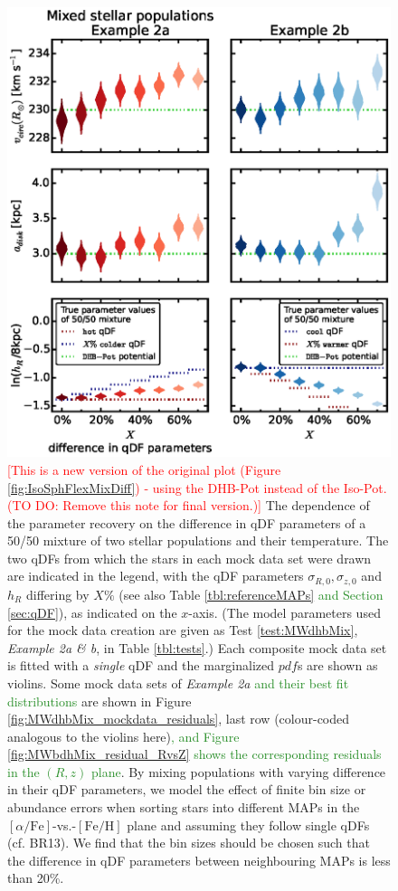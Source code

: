 \documentclass[iop,revtex4,numberedappendix,appendixfloats]{emulateapj}
\newcommand{\pdf}{\ensuremath{pdf}}
\newcommand{\MAPs}{MAPs}
\newcommand{\NEW}[1]{\textcolor{ForestGreen}{#1}}
\newcommand{\NOTE}[1]{\textcolor{Red}{#1}}
\begin{document}
\begin{figure}[!htbp]
\centering
\includegraphics[scale=0.55]{figs/MWbdhMixDiff_violins.eps}
\caption{\NOTE{[This is a new version of the original plot (Figure \ref{fig:IsoSphFlexMixDiff}) - using the DHB-Pot instead of the Iso-Pot. (TO DO: Remove this note for final version.)]} The dependence of the parameter recovery on the difference in qDF parameters of a 50/50 mixture of two stellar populations and their temperature. The two qDFs from which the stars in each mock data set were drawn are indicated in the legend, with the qDF parameters $\sigma_{R,0}, \sigma_{z,0}$ and $h_R$ differing by $X\%$ (see also Table \ref{tbl:referenceMAPs} \NEW{and Section \ref{sec:qDF}}), as indicated on the $x$-axis. (The model parameters used for the mock data creation are given as Test \ref{test:MWdhbMix}, \emph{Example 2a \& b}, in Table \ref{tbl:tests}.) Each composite mock data set is fitted with a \emph{single} qDF and the marginalized \pdf{}s are shown as violins. Some mock data sets of \emph{Example 2a} \NEW{and their best fit distributions} are shown in Figure \ref{fig:MWdhbMix_mockdata_residuals}, last row (colour-coded analogous to the violins here)\NEW{, and Figure \ref{fig:MWbdhMix_residual_RvsZ} shows the corresponding residuals in the $(R,z)$ plane}. By mixing populations with varying difference in their qDF parameters, we model the effect of finite bin size or abundance errors when sorting stars into different \MAPs{} in the $[\alpha/\mathrm{Fe}]$-vs.-$[\mathrm{Fe}/\mathrm{H}]$ plane and assuming they follow single qDFs (cf. BR13). We find that the bin sizes should be chosen such that the difference in qDF parameters between neighbouring \MAPs{} is less than 20\%.} 
\label{fig:MWdhbMixDiff}
\end{figure}
\end{document}
